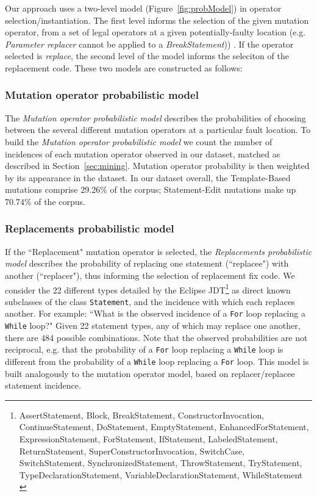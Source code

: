 \documentclass[conference]{IEEEtran}
\begin{document}
Our approach uses a two-level model (Figure~\ref{fig:probModel}) in operator
selection/instantiation.  The first level informs the selection of the given
mutation operator, from a set of legal operators at a given potentially-faulty
location (e.g. \emph{Parameter replacer} cannot be applied to a \emph{BreakStatement})) .  If the operator selected is \emph{replace}, the second level of the
model informs the seleciton of the replacement code.  These two models are
constructed as follows: 

\subsubsection{Mutation operator probabilistic model}
The \textit{Mutation operator probabilistic model} 
describes the probabilities of choosing between the several different mutation 
operators at a particular fault location.
%
To build the \textit{Mutation operator probabilistic model} 
we count the number of incidences of each mutation operator observed in our
dataset, matched as described in Section~\ref{sec:mining}. Mutation operator probability is then
weighted by its appearance in the dataset.  
%
In our dataset overall, the Template-Based mutations comprise 29.26\% of the corpus; Statement-Edit mutations make up 70.74\% of the 
corpus.

\subsubsection{Replacements probabilistic model}
If the ``Replacement" mutation operator is 
selected, the \textit{Replacements probabilistic model} describes the probability of replacing one statement (``replacee") with
another (``replacer"), thus informing the selection of replacement fix code.
We consider 
the 22 different types detailed by the Eclipse
JDT\footnote{AssertStatement, Block, BreakStatement, ConstructorInvocation, ContinueStatement, DoStatement, EmptyStatement, EnhancedForStatement, ExpressionStatement, ForStatement, IfStatement, LabeledStatement, ReturnStatement, SuperConstructorInvocation, SwitchCase, SwitchStatement, SynchronizedStatement, ThrowStatement, TryStatement, TypeDeclarationStatement, VariableDeclarationStatement, WhileStatement \label{stmtNames}} as
direct known subclasses of the class \texttt{Statement}, and the incidence with which
each 
replaces another. For example: ``What is the observed incidence of a \texttt{For} loop 
replacing a \texttt{While} loop?" Given 22 statement types, any of which may replace one
another, there are 484 possible combinations. 
Note that the observed probabilities are not reciprocal, e.g. 
that the probability of a \texttt{For} loop replacing a \texttt{While} loop is different from the 
probability of a \texttt{While} loop replacing a \texttt{For} loop.
This model is built analogously to the
mutation operator model, based on replacer/replacee statement incidence. 
\end{document}
